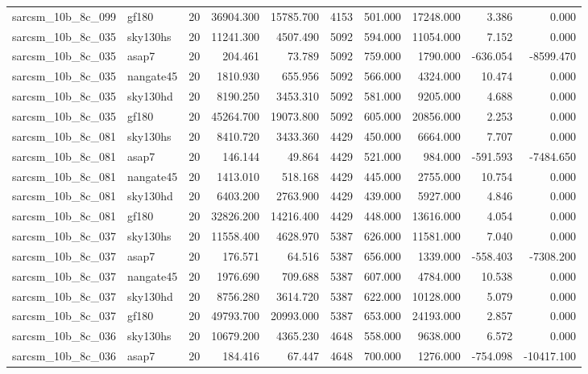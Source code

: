 \begin{tabular}{llrrrrrrrr}
sarcsm\_10b\_8c\_099 & gf180 & 20 & 36904.300 & 15785.700 & 4153 & 501.000 & 17248.000 & 3.386 & 0.000 \\
sarcsm\_10b\_8c\_035 & sky130hs & 20 & 11241.300 & 4507.490 & 5092 & 594.000 & 11054.000 & 7.152 & 0.000 \\
sarcsm\_10b\_8c\_035 & asap7 & 20 & 204.461 & 73.789 & 5092 & 759.000 & 1790.000 & -636.054 & -8599.470 \\
sarcsm\_10b\_8c\_035 & nangate45 & 20 & 1810.930 & 655.956 & 5092 & 566.000 & 4324.000 & 10.474 & 0.000 \\
sarcsm\_10b\_8c\_035 & sky130hd & 20 & 8190.250 & 3453.310 & 5092 & 581.000 & 9205.000 & 4.688 & 0.000 \\
sarcsm\_10b\_8c\_035 & gf180 & 20 & 45264.700 & 19073.800 & 5092 & 605.000 & 20856.000 & 2.253 & 0.000 \\
sarcsm\_10b\_8c\_081 & sky130hs & 20 & 8410.720 & 3433.360 & 4429 & 450.000 & 6664.000 & 7.707 & 0.000 \\
sarcsm\_10b\_8c\_081 & asap7 & 20 & 146.144 & 49.864 & 4429 & 521.000 & 984.000 & -591.593 & -7484.650 \\
sarcsm\_10b\_8c\_081 & nangate45 & 20 & 1413.010 & 518.168 & 4429 & 445.000 & 2755.000 & 10.754 & 0.000 \\
sarcsm\_10b\_8c\_081 & sky130hd & 20 & 6403.200 & 2763.900 & 4429 & 439.000 & 5927.000 & 4.846 & 0.000 \\
sarcsm\_10b\_8c\_081 & gf180 & 20 & 32826.200 & 14216.400 & 4429 & 448.000 & 13616.000 & 4.054 & 0.000 \\
sarcsm\_10b\_8c\_037 & sky130hs & 20 & 11558.400 & 4628.970 & 5387 & 626.000 & 11581.000 & 7.040 & 0.000 \\
sarcsm\_10b\_8c\_037 & asap7 & 20 & 176.571 & 64.516 & 5387 & 656.000 & 1339.000 & -558.403 & -7308.200 \\
sarcsm\_10b\_8c\_037 & nangate45 & 20 & 1976.690 & 709.688 & 5387 & 607.000 & 4784.000 & 10.538 & 0.000 \\
sarcsm\_10b\_8c\_037 & sky130hd & 20 & 8756.280 & 3614.720 & 5387 & 622.000 & 10128.000 & 5.079 & 0.000 \\
sarcsm\_10b\_8c\_037 & gf180 & 20 & 49793.700 & 20993.000 & 5387 & 653.000 & 24193.000 & 2.857 & 0.000 \\
sarcsm\_10b\_8c\_036 & sky130hs & 20 & 10679.200 & 4365.230 & 4648 & 558.000 & 9638.000 & 6.572 & 0.000 \\
sarcsm\_10b\_8c\_036 & asap7 & 20 & 184.416 & 67.447 & 4648 & 700.000 & 1276.000 & -754.098 & -10417.100 \\

\end{tabular}

